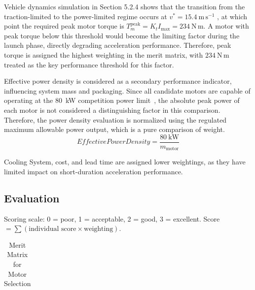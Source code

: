 \documentclass[11pt, a4paper]{report}
\numberwithin{equation}{section}
\begin{document}
\begin{refsection}
Vehicle dynamics simulation in Section 5.2.4 shows that the transition from the traction-limited to the power-limited regime occurs at $v^* = 15.4\ \mathrm{m\,s^{-1}}$ , at which point the required peak motor torque is $T_m^\mathrm{peak} = K_t I_\mathrm{max} = 234\ \mathrm{N\,m}$. A motor with peak torque below this threshold would become the limiting 
factor during the launch phase, directly degrading acceleration performance. Therefore, peak torque is assigned the highest weighting in the merit matrix, with $234\ \mathrm{N\,m}$ treated as the key performance threshold for this factor.

Effective power density is considered as a secondary performance indicator, influencing system mass and packaging. Since all candidate motors are capable of operating at the 80~kW competition power limit~\cite{fs-ev-rules2026}, the absolute peak power of each motor is not considered a distinguishing factor in this comparison. Therefore, the power density evaluation is normalized using the regulated maximum allowable power output, which is a pure comparison of weight.
\begin{equation}
Effective Power Density = \frac{80\ \text{kW}}{m_{\text{motor}}}
\end{equation}

Cooling System, cost, and lead time are assigned lower weightings, as they have limited impact on short-duration acceleration performance.

\subsection{Evaluation}

\begin{table}[H]
\centering
\small
\renewcommand{\arraystretch}{1}
\setlength{\tabcolsep}{4pt}

\caption{Merit Matrix for Motor Selection}
\label{tab:motor_merit_matrix}

\small
Scoring scale: 0 = poor, 1 = acceptable, 2 = good, 3 = excellent.  
Score $= \sum (\text{individual score} \times \text{weighting})$.
\label{tab:motor_selection}


\begin{tabularx}{\textwidth}{
>{\raggedright\arraybackslash}p{3.5cm}
>{\centering\arraybackslash}p{1.7cm}
>{\centering\arraybackslash}p{1.7cm}
>{\centering\arraybackslash}p{3.0cm}
>{\centering\arraybackslash}p{1.7cm}
>{\centering\arraybackslash}p{1.7cm}
>{\centering\arraybackslash}p{1.7cm}
}
\toprule


\end{tabularx}
\end{table}
\end{refsection}
\end{document}
